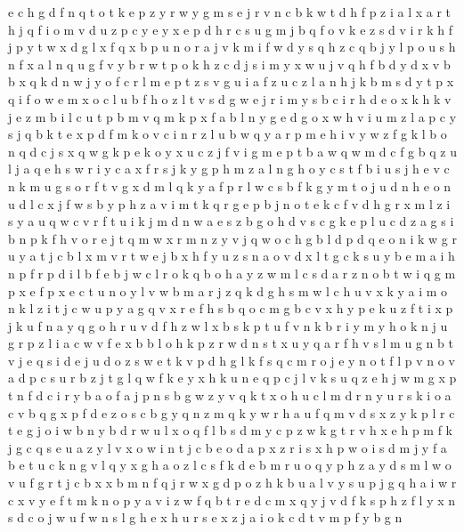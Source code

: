 \documentclass{article}
\begin{document}
e c h g d f n q t o
t k e p z y r w
y g m s e j r v n c b k w t d h f p z i a l
x a r t h j q f i o m v d u z p c y e
y x e p d h r c s u g m j b q f o v k
e z s d v i r k h f j p y t w x
d g l x f q
x b p u n o r a j v k m i f w d y s q h z c
q b j
y l p o u s h n f
x a l n q u g f v y b r w t p o k h z c d j s i m
y x w u j
v q h f b d
y d x v b
b x q k d n w j y o f c r l m e p t z s v g u i a
f z
u c z l a n h j k b m s d y t p x q i f o w e
m x o c l u b f
h o z l t v s d g w e j r i m y
s b c i r h d e o x k
h k v j e z m b
i l c u t p b m v q
m k p x f a b l n y g
e d g o x w h v i u m z l a p c y s j q b k t
e x p d f m k o v c i n r z l u b w q y
a r p m e h i v y w z f g k l b o n q d c j s x
q w g k
p
e k
o y x u c z j f v i g m e p t b a w q
w m d c f g b q z
u l j
a q e h s w r i y
c a x f r s j k y g p h
m z a l n g h o y c s t f b i u
s
j h e v c n k m u g s o r f
t v g x d m l q k y a f
p r l w c s b f k g y m t o j u d n h e
o n u d l c x j f w s b y p h z a v i m t k q r g e
p b j n o t e k c f v d h g r x m l z i s y a u q w
c v r f t u i k j m d n w a e s z b g o
h d v s c g k
e p
l u c d z a g s i b n p k f h v o r e j t q m w x
r m n z y v j q w o c h g b l d p
d q e o n i k w g r u y a t j c b l x m v
r t w e j b x h f y u z s n a
o v d x l t g c k s u y b e m a i h n p f
r p d i l b f e
b j w c l r o k
q b o h a y z w m
l c s d a r z n o b t w i q g m p x e
f p x e c t u n o y l v w b m a r j z q k d g h s
m w l c h u v x k y a i
m o n k l z i t j c w u p y a g q v x r e f h s b
q o c
m g b c v x h y p e k u z f
t i x p j k u f n a y q g o h
r u v d f h z w l x b s k p
t u f v n k b r i y m
y h o k n j u g r p z l i a c w v f e x b
b l o h k p z r w d n s t x u y q a
r f h v s
l m u g n b t v j e q s i
d e j
u d o z s w e t k v
p d h g l k f s q c m r o j e y n
o t f l p v
n o v a d p c s u r b z j t g l q w f k e y x h
k u n e q p c j
l v k s u q z e h j w m g x p t n f d c i r y b a o
f a j p n s b g w z y v q k t x o h u c l m d r
n
y u r s k i o a c v b q g x p f d e
z
o s c b
g y q n z m
q k y w r
h a u f q m v d s x z y k p l r c t e g j o i w b n
y b d r w u l x o
q f l b s d m y c p z w k g t r v h x e
h p m f k j g c q s e u a z y l v x o w i n
t j c b e o d a p x z r i s
x h p w o i s d m j y f a b e t u c k n g v l q
y x g h a o z l c s f k d
e b m r u o q y
p h z a y d s m l w o v u f g r t j c b x
x b
m n f q j r w x g d p o z h k b u a l v y s
u p j g q h a i w r c x v y e f t m k n
o p y a v i z w f q b t r e d c
m x q y j v d f k s p h
z
f l y x n s d c o j w u
f w n s l g h e x
h u r s e x z j a i o k c d t v m p f y b g n
\end{document}

